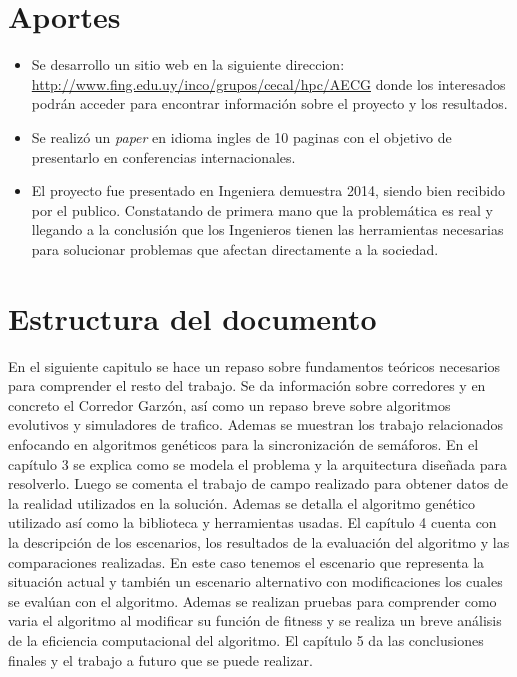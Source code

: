 \section{Aportes}

\begin{itemize}
	\item Se desarrollo un sitio web en la siguiente direccion: \url{http://www.fing.edu.uy/inco/grupos/cecal/hpc/AECG} donde los interesados podrán acceder para encontrar información sobre el proyecto y los resultados. 
	\item Se realizó un \emph{paper} en idioma ingles de 10 paginas con el objetivo de presentarlo en conferencias internacionales.
	\item El proyecto fue presentado en Ingeniera demuestra 2014, siendo bien recibido por el publico. Constatando de primera mano que la problemática es real y llegando a la conclusión que los Ingenieros tienen las herramientas necesarias para solucionar problemas que afectan directamente a la sociedad.

\end{itemize}






\section{Estructura del documento}
En el siguiente capitulo se hace un repaso sobre fundamentos teóricos necesarios para comprender el resto del trabajo. Se da información sobre corredores y en concreto el Corredor Garzón, así como un repaso breve sobre algoritmos evolutivos y simuladores de trafico. Ademas se muestran los trabajo relacionados enfocando en algoritmos genéticos para la sincronización de semáforos.
En el capítulo 3 se explica como se modela el problema y la arquitectura diseñada  para resolverlo. Luego se comenta el trabajo de campo realizado para obtener datos de la realidad utilizados en la solución. Ademas se detalla el algoritmo genético utilizado así como la biblioteca y herramientas usadas.
El capítulo 4 cuenta con la descripción de los escenarios, los resultados de la evaluación del algoritmo y las comparaciones realizadas. En este caso tenemos el escenario que representa la situación actual y también un escenario alternativo con modificaciones los cuales se evalúan con el algoritmo. Ademas se realizan pruebas para comprender como varia el algoritmo al modificar su función de fitness y se realiza un breve análisis de la eficiencia computacional del algoritmo.
El capítulo 5 da las conclusiones finales y el trabajo a futuro que se puede realizar.






